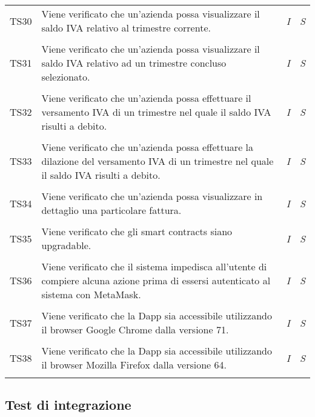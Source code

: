 \begin{longtable}{ >{\centering}p{} >{}p{}
			>{\centering}p{} >{\centering}p{}}
		\tabularnewline
		\hypertarget{TS30}{TS30} & Viene verificato che un'azienda possa 
		visualizzare il saldo IVA relativo al trimestre corrente. & 
		\textit{I} & \textit{S}\\ 

		\tabularnewline
		\hypertarget{TS31}{TS31} & Viene verificato che un'azienda possa 
		visualizzare il saldo IVA relativo ad un trimestre concluso selezionato. & 
		\textit{I} & \textit{S}\\ 

		\tabularnewline
		\hypertarget{TS32}{TS32} & Viene verificato che un'azienda possa 
		effettuare il versamento IVA di un trimestre nel quale il saldo IVA risulti a 
		debito. & \textit{I} & \textit{S}\\ 

		\tabularnewline
		\hypertarget{TS33}{TS33} & Viene verificato che un'azienda possa 
		effettuare la dilazione del versamento IVA di un trimestre nel quale il saldo 
		IVA risulti a debito. & \textit{I} & \textit{S}\\ 

		\tabularnewline
		\hypertarget{TS34}{TS34} & Viene verificato che un'azienda possa 
		visualizzare in dettaglio una particolare fattura. & \textit{I} & \textit{S}\\ 

		\tabularnewline
		\hypertarget{TS35}{TS35} & Viene verificato che gli smart contracts siano 
		upgradable. & \textit{I} & \textit{S}\\ 

		\tabularnewline
		\hypertarget{TS36}{TS36} & Viene verificato che il sistema impedisca 
		all'utente di compiere alcuna azione prima di essersi autenticato al sistema con 
		MetaMask. & \textit{I} & \textit{S}\\ 

		\tabularnewline
		\hypertarget{TS37}{TS37} & Viene verificato che la Dapp sia accessibile 
		utilizzando il browser Google Chrome dalla versione 71. & 
		\textit{I} & \textit{S}\\

		\tabularnewline
		\hypertarget{TS38}{TS38} & Viene verificato che la Dapp sia accessibile 
		utilizzando il browser Mozilla Firefox dalla versione 64. & \textit{I} 
		& \textit{S}\\  
		\tabularnewline
		\end{longtable}


\subsection{Test di integrazione}
	\renewcommand{\arraystretch}{1.5}
		
